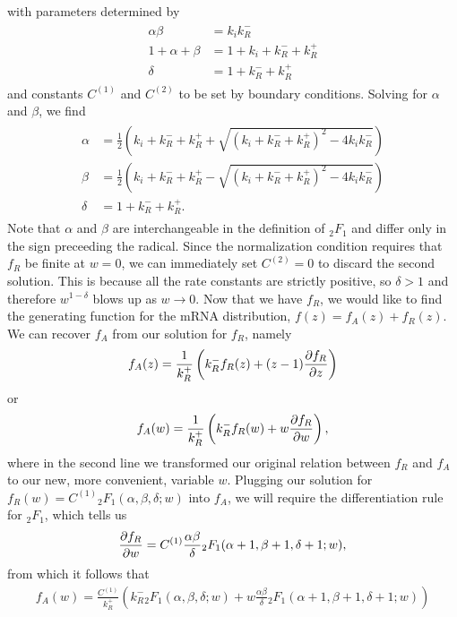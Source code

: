 with parameters determined by
\begin{align}
\begin{split}
\alpha\beta &= k_i k_R^-
\\
1+\alpha+\beta &= 1+k_i+k_R^-+k_R^+
\\
\delta &= 1 + k_R^- + k_R^+
\end{split}
\end{align}
and constants $C^{(1)}$ and $C^{(2)}$ to be set by boundary conditions. Solving for
$\alpha$ and $\beta$, we find
\begin{align}
\begin{split}
\alpha &= \frac{1}{2}
\left(k_i+k_R^-+k_R^+ + \sqrt{(k_i+k_R^-+k_R^+)^2 - 4k_i k_R^-}\right)
\\
\beta &= \frac{1}{2}
\left(k_i+k_R^-+k_R^+ - \sqrt{(k_i+k_R^-+k_R^+)^2 - 4k_i k_R^-}\right)
\\
\delta &= 1 + k_R^- + k_R^+.
\end{split}
\end{align}
Note that $\alpha$ and $\beta$ are interchangeable in the definition of
${_2F_1}$ and differ only in the sign preceeding the radical.
Since the normalization condition requires that $f_R$ be finite at $w=0$,
we can immediately set $C^{(2)}=0$ to discard the second solution.
This is because all the rate constants are strictly positive,
so $\delta>1$ and therefore $w^{1-\delta}$ blows up as $w\rightarrow0$.
Now that we have $f_R$, we would like to find the generating function
for the mRNA distribution, $f(z) = f_A(z) + f_R(z)$.
We can recover $f_A$ from our solution for $f_R$, namely
\begin{align}
f_A(z) = \frac{1}{k_R^+}\left(k_R^- f_R(z) + (z-1) \pderiv[f_R]{z}\right)
\end{align}
or
\begin{align}
f_A(w) = \frac{1}{k_R^+}\left(k_R^- f_R(w) + w \pderiv[f_R]{w}\right),
\end{align}
where in the second line we transformed our original relation between
$f_R$ and $f_A$ to our new, more convenient, variable $w$.
Plugging our solution for $f_R(w) = C^{(1)}{_2F_1}(\alpha, \beta, \delta; w)$
into $f_A$, we will require the differentiation rule for ${_2F_1}$,
which tells us
\begin{align}
\pderiv[f_R]{w} = C^{(1)}\frac{\alpha\beta}{\delta}
                {_2F_1}(\alpha+1, \beta+1, \delta+1; w),
\end{align}
from which it follows that
\begin{align}
f_A(w) = \frac{C^{(1)}}{k_R^+}
\left(
k_R^- {_2F_1}(\alpha, \beta, \delta; w)
+ w\frac{\alpha\beta}{\delta} {_2F_1}(\alpha+1, \beta+1, \delta+1; w)
\right)
\end{align}
